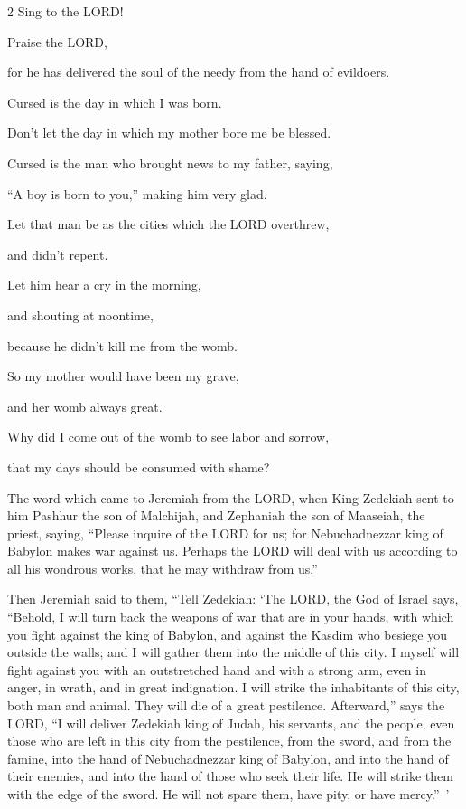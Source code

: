 \begin{multicols}{2}
\myverse{}Sing to the LORD!

Praise the LORD,

for he has delivered the soul of the needy from the hand of evildoers.


\myverse{}Cursed is the day in which I was born.

Don’t let the day in which my mother bore me be blessed.


\myverse{}Cursed is the man who brought news to my father, saying,

“A boy is born to you,” making him very glad.


\myverse{}Let that man be as the cities which the LORD overthrew,

and didn’t repent.

Let him hear a cry in the morning,

and shouting at noontime,


\myverse{}because he didn’t kill me from the womb.

So my mother would have been my grave,

and her womb always great.


\myverse{}Why did I come out of the womb to see labor and sorrow,

that my days should be consumed with shame?
\end{multicols}

\mychapter{} \myverse*{}The word which came to Jeremiah from the LORD, when King Zedekiah sent to him Pashhur the son of Malchijah, and Zephaniah the son of Maaseiah, the priest, saying, \myverse{}“Please inquire of the LORD for us; for Nebuchadnezzar king of Babylon makes war against us. Perhaps the LORD will deal with us according to all his wondrous works, that he may withdraw from us.”


\myverse{}Then Jeremiah said to them, “Tell Zedekiah: \myverse{}‘The LORD, the God of Israel says, “Behold, I will turn back the weapons of war that are in your hands, with which you fight against the king of Babylon, and against the Kasdim who besiege you outside the walls; and I will gather them into the middle of this city. \myverse{}I myself will fight against you with an outstretched hand and with a strong arm, even in anger, in wrath, and in great indignation. \myverse{}I will strike the inhabitants of this city, both man and animal. They will die of a great pestilence. \myverse{}Afterward,” says the LORD, “I will deliver Zedekiah king of Judah, his servants, and the people, even those who are left in this city from the pestilence, from the sword, and from the famine, into the hand of Nebuchadnezzar king of Babylon, and into the hand of their enemies, and into the hand of those who seek their life. He will strike them with the edge of the sword. He will not spare them, have pity, or have mercy.” ’


